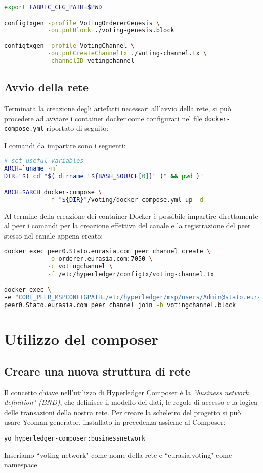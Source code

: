 \begin{lstlisting}[language=bash]
export FABRIC_CFG_PATH=$PWD

configtxgen -profile VotingOrdererGenesis \
			-outputBlock ./voting-genesis.block
			
configtxgen -profile VotingChannel \
			-outputCreateChannelTx ./voting-channel.tx \
			-channelID votingchannel
\end{lstlisting}

	\subsection{Avvio della rete}
		Terminata la creazione degli artefatti necessari all'avvio della rete, si può procedere ad avviare i container docker come configurati nel file \lstinline{docker-compose.yml} riportato di seguito:
		
		
		I comandi da impartire sono i seguenti:
		
\begin{lstlisting}[language=bash]
# set useful variables
ARCH=`uname -m`
DIR="$( cd "$( dirname "${BASH_SOURCE[0]}" )" && pwd )"

ARCH=$ARCH docker-compose \
			-f "${DIR}"/voting/docker-compose.yml up -d
\end{lstlisting}

		Al termine della creazione dei container Docker è possibile impartire direttamente al peer i comandi per la creazione effettiva del canale e la registrazione del peer stesso nel canale appena creato:

\begin{lstlisting}[language=bash]
docker exec peer0.Stato.eurasia.com peer channel create \
			-o orderer.eurasia.com:7050 \
			-c votingchannel \
			-f /etc/hyperledger/configtx/voting-channel.tx

docker exec \
-e "CORE_PEER_MSPCONFIGPATH=/etc/hyperledger/msp/users/Admin@stato.eurasia.com/msp" \
peer0.Stato.eurasia.com peer channel join -b votingchannel.block
\end{lstlisting}
	
\section{Utilizzo del composer}
	\subsection{Creare una nuova struttura di rete}
		Il concetto chiave nell'utilizzo di Hyperledger Composer è la \emph{``business network definition" (BND)}, che definisce il modello dei dati, le regole di accesso e la logica delle transazioni della nostra rete. Per creare la scheletro del progetto si può usare Yeoman generator, installato in precedenza assieme al Composer:
\begin{lstlisting}
yo hyperledger-composer:businessnetwork
\end{lstlisting}
		Inseriamo ``voting-network" come nome della rete e ``eurasia.voting" come namespace.
